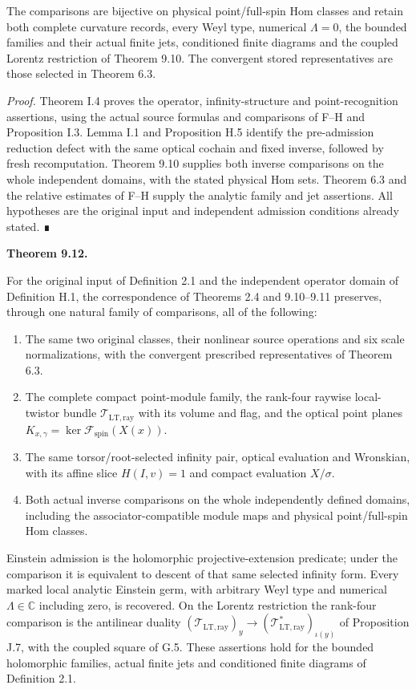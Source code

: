 \documentclass[
  english,
  11pt,
  reqno]{amsart}
\makeatletter
\providecommand{\tightlist}{%
  \setlength{\itemsep}{0pt}\setlength{\parskip}{0pt}}
\newcommand{\pandocstatementheading}[1]{%
  \par\addpenalty{\@beginparpenalty}%
  \addvspace{.5\baselineskip plus .2\baselineskip minus .2\baselineskip}%
  {\normalfont\bfseries #1\par}%
  \nobreak\@afterindenttrue\@afterheading
}
\makeatother
\begin{document}
The comparisons are bijective on physical point/full-spin Hom classes
and retain both complete curvature records, every Weyl type, numerical
\(\Lambda=0\), the bounded families and their actual finite jets,
conditioned finite diagrams and the coupled Lorentz restriction of
Theorem 9.10. The convergent stored representatives are those selected
in Theorem 6.3.

\emph{Proof.} Theorem I.4 proves the operator, infinity-structure and
point-recognition assertions, using the actual source formulas and
comparisons of F--H and Proposition I.3. Lemma I.1 and Proposition H.5
identify the pre-admission reduction defect with the same optical
cochain and fixed inverse, followed by fresh recomputation. Theorem 9.10
supplies both inverse comparisons on the whole independent domains, with
the stated physical Hom sets. Theorem 6.3 and the relative estimates of
F--H supply the analytic family and jet assertions. All hypotheses are
the original input and independent admission conditions already stated.
∎

\pandocstatementheading{\protect{}\label{thm:gg-unified-projective-gravitational-correspondence}Theorem 9.12.}

For the original input of Definition 2.1 and the independent operator
domain of Definition H.1, the correspondence of Theorems 2.4 and
9.10--9.11 preserves, through one natural family of comparisons, all of
the following:

\begin{enumerate}
\tightlist
\item
  The same two original classes, their nonlinear source operations and
  six scale normalizations, with the convergent prescribed
  representatives of Theorem 6.3.
\item
  The complete compact point-module family, the rank-four raywise
  local-twistor bundle \(\mathcal T_{\mathrm{LT,ray}}\) with its volume
  and flag, and the optical point planes
  \(K_{x,\gamma}=\ker\mathcal F_{\mathrm{spin}}(X(x))\).
\item
  The same torsor/root-selected infinity pair, optical evaluation and
  Wronskian, with its affine slice \(H(I,v)=1\) and compact evaluation
  \(X/\sigma\).
\item
  Both actual inverse comparisons on the whole independently defined
  domains, including the associator-compatible module maps and physical
  point/full-spin Hom classes.
\end{enumerate}

Einstein admission is the holomorphic projective-extension predicate;
under the comparison it is equivalent to descent of that same selected
infinity form. Every marked local analytic Einstein germ, with arbitrary
Weyl type and numerical \(\Lambda\in\mathbb C\) including zero, is
recovered. On the Lorentz restriction the rank-four comparison is the
antilinear duality
\((\mathcal T_{\mathrm{LT,ray}})_y\to (\mathcal T_{\mathrm{LT,ray}}^*)_{\iota(y)}\)
of Proposition J.7, with the coupled square of G.5. These assertions
hold for the bounded holomorphic families, actual finite jets and
conditioned finite diagrams of Definition 2.1.
\end{document}
